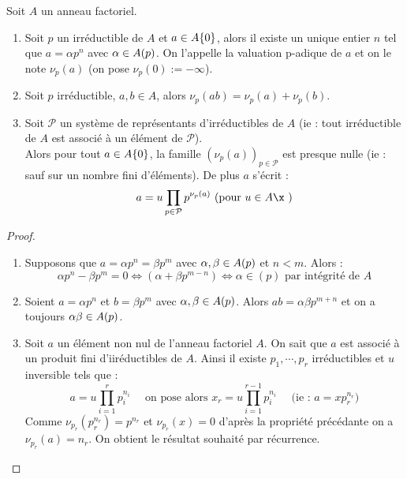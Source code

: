 \begin{defiprop}
 
Soit $A$ un anneau factoriel. 
\begin{enumerate}
 \item Soit $p$ un irréductible de $A$ et $a\in A\-\{0\}$, alors il
existe un unique entier $n$ tel que $a=\alpha p^n$ avec $\alpha \in
A\-(p)$. On l'appelle la valuation p-adique de $a$ et on le note
$\nu_p(a)$ (on pose $\nu_p(0) := -\infty$).
 \item Soit $p$ irréductible, $a,b \in A$, alors $\nu_p(ab) = \nu_p(a) +
\nu_p(b)$.
 \item Soit $\mathcal{P}$ un système de représentants d'irréductibles de $A$
(ie : tout irréductible de $A$ est associé à un élément de $\mathcal{P}$).\\
Alors pour tout $a \in A\-\{0\}$, la famille
$(\nu_p(a))_{p\in\mathcal{P}}$ est presque nulle (ie : sauf sur un nombre fini
d'éléments). De plus $a$ s'écrit :
\begin{displaymath}
 a = u\prod_{p\in\mathcal{P}}p^{\nu_p(a)} \text{ (pour } u\in A\x\text{ )}
\end{displaymath}
\end{enumerate}
\end{defiprop}

\begin{proof}\
 \begin{enumerate}
  \item Supposons que $a = \alpha p^n = \beta p^m$ avec $\alpha,\beta\in
A\-(p)$ et $n < m$. Alors :
\begin{displaymath}
 \alpha p^n - \beta p^m = 0 \Longleftrightarrow (\alpha + \beta p^{m-n})
\Longleftrightarrow \alpha \in (p) \text{ par intégrité de } A
\end{displaymath}
\item Soient $a=\alpha p^n$ et $b = \beta p^m$ avec $\alpha,\beta\in
A\-(p)$. Alors $ab = \alpha \beta p^{m+n}$ et on a toujours $\alpha
\beta \in A \- (p)$.
\item Soit $a$ un élément non nul de l'anneau factoriel $A$. On sait que $a$
est associé à un produit fini d'iiréductibles de $A$. Ainsi il existe
$p_1,\cdots,p_r$ irréductibles et $u$ inversible tels que : 
\begin{displaymath}
 a = u\prod_{i=1}^r p_i^{n_i} \quad \text{ on pose alors } x_r =
u\prod_{i=1}^{r-1} p_i^{n_i} \quad \text{ (ie : } a = x p_r^{n_r}\text{)}
\end{displaymath}
Comme $\nu_{p_r}(p_r^{n_r}) = p^{n_r}$ et $\nu_{p_r}(x) = 0$ d'après la
propriété précédante on a $\nu_{p_r}(a) = n_r$. On obtient le résultat souhaité
par récurrence.
 \end{enumerate}
\end{proof}

